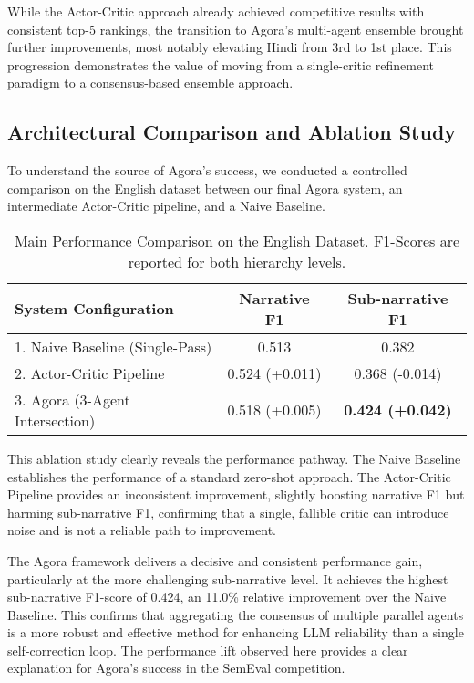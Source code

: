 While the Actor-Critic approach already achieved competitive results with consistent top-5 rankings, the transition to Agora's multi-agent ensemble brought further improvements, most notably elevating Hindi from 3rd to 1st place. This progression demonstrates the value of moving from a single-critic refinement paradigm to a consensus-based ensemble approach.

\subsection{Architectural Comparison and Ablation Study}

To understand the source of Agora's success, we conducted a controlled comparison on the English dataset between our final Agora system, an intermediate Actor-Critic pipeline, and a Naive Baseline.

\begin{table*}[ht]
\centering
\caption{Main Performance Comparison on the English Dataset. F1-Scores are reported for both hierarchy levels.}
\label{tab:main_comparison}
\begin{tabular}{lcc}
\hline
\textbf{System Configuration} & \textbf{Narrative F1} & \textbf{Sub-narrative F1} \\
\hline
1. Naive Baseline (Single-Pass) & 0.513 & 0.382 \\
2. Actor-Critic Pipeline & 0.524 (+0.011) & 0.368 (-0.014) \\
3. Agora (3-Agent Intersection) & 0.518 (+0.005) & \textbf{0.424 (+0.042)} \\
\hline
\end{tabular}
\end{table*}

This ablation study clearly reveals the performance pathway. The Naive Baseline establishes the performance of a standard zero-shot approach. The Actor-Critic Pipeline provides an inconsistent improvement, slightly boosting narrative F1 but harming sub-narrative F1, confirming that a single, fallible critic can introduce noise and is not a reliable path to improvement.

The Agora framework delivers a decisive and consistent performance gain, particularly at the more challenging sub-narrative level. It achieves the highest sub-narrative F1-score of 0.424, an 11.0\% relative improvement over the Naive Baseline. This confirms that aggregating the consensus of multiple parallel agents is a more robust and effective method for enhancing LLM reliability than a single self-correction loop. The performance lift observed here provides a clear explanation for Agora's success in the SemEval competition.

